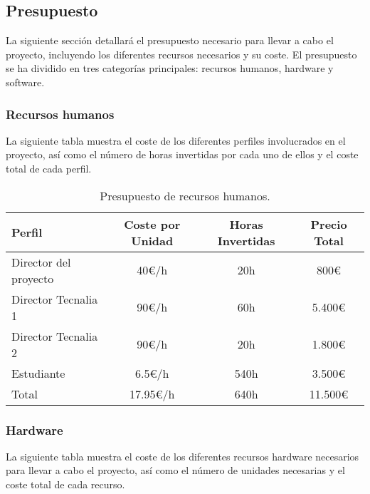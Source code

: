 \subsection{Presupuesto}
La siguiente sección detallará el presupuesto necesario para llevar a cabo el
proyecto, incluyendo los diferentes recursos necesarios y su coste. El
presupuesto se ha dividido en tres categorías principales: recursos humanos,
hardware y software.

\subsubsection{Recursos humanos}
La siguiente tabla muestra el coste de los diferentes perfiles involucrados en
el proyecto, así como el número de horas invertidas por cada uno de ellos y el
coste total de cada perfil.

\begin{table}[ht]
    \centering
    \begin{tabular}[ht]{l|c|c|c}
        \textbf{Perfil}       & \textbf{Coste por Unidad} & \textbf{Horas Invertidas} & \textbf{Precio Total} \\
        \hline
        Director del proyecto & 40\euro/h             & 20h                       & 800\euro              \\
        Director Tecnalia 1   & 90\euro/h             & 60h                       & 5.400\euro            \\
        Director Tecnalia 2   & 90\euro/h             & 20h                       & 1.800\euro            \\
        Estudiante            & 6.5\euro/h            & 540h                      & 3.500\euro            \\
        \hline
        Total                 & 17.95\euro/h           & 640h                      & 11.500\euro           \\
    \end{tabular}
    \caption{Presupuesto de recursos humanos.}\label{tab:huma-resources}
\end{table}

\subsubsection{Hardware}
La siguiente tabla muestra el coste de los diferentes recursos hardware
necesarios para llevar a cabo el proyecto, así como el número de unidades
necesarias y el coste total de cada recurso.

